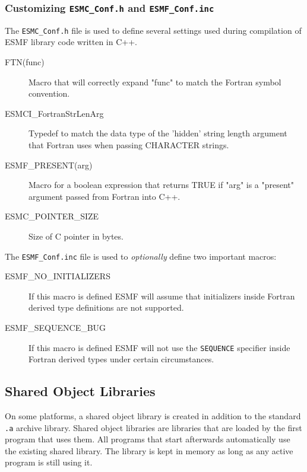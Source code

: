 \subsubsection{Customizing {\tt ESMC\_Conf.h} and {\tt ESMF\_Conf.inc}}

The {\tt ESMC\_Conf.h} file is used to define several settings used
during compilation of ESMF library code written in C++.

\begin{description}

\item[FTN(func)]
Macro that will correctly expand "func" to match the Fortran symbol convention.

\item[ESMCI\_FortranStrLenArg]
Typedef to match the data type of the 'hidden' string length argument that
Fortran uses when passing CHARACTER strings.

\item[ESMF\_PRESENT(arg)]
Macro for a boolean expression that returns TRUE if "arg" is a "present"
argument passed from Fortran into C++.

\item[ESMC\_POINTER\_SIZE]
Size of C pointer in bytes.

\end{description}


The {\tt ESMF\_Conf.inc} file is used to {\em optionally} define two 
important macros:

\begin{description}

\item[ESMF\_NO\_INITIALIZERS]
If this macro is defined ESMF will assume that initializers inside 
Fortran derived type definitions are not supported.

\item[ESMF\_SEQUENCE\_BUG]
If this macro is defined ESMF will not use the {\tt SEQUENCE} specifier
inside Fortran derived types under certain circumstances.

\end{description}


\subsection{Shared Object Libraries}

On some platforms, a shared object library is created in addition to the
standard {\tt .a} archive library.
Shared object libraries are libraries that are loaded by the first program 
that uses them. All programs that start afterwards automatically use the 
existing shared library. The library is kept in memory as long as any 
active program is still using it. 

